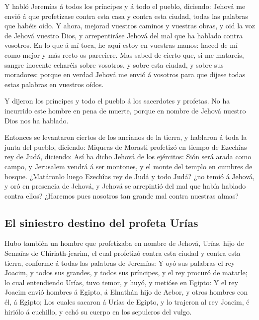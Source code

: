  Y habló Jeremías á todos los príncipes y á todo el
pueblo, diciendo: Jehová me envió á que profetizase contra esta casa y
contra esta ciudad, todas las palabras que habéis oído. 
Y ahora, mejorad vuestros caminos y vuestras obras, y oid la voz de
Jehová vuestro Dios, y arrepentiráse Jehová del mal que ha hablado
contra vosotros.  En lo que á mí toca, he aquí estoy en
vuestras manos: haced de mí como mejor y más recto os pareciere.
 Mas sabed de cierto que, si me matareis, sangre inocente
echaréis sobre vosotros, y sobre esta ciudad, y sobre sus moradores:
porque en verdad Jehová me envió á vosotros para que dijese todas estas
palabras en vuestros oídos.

 Y dijeron los príncipes y todo el pueblo á los
sacerdotes y profetas. No ha incurrido este hombre en pena de muerte,
porque en nombre de Jehová nuestro Dios nos ha hablado.

 Entonces se levantaron ciertos de los ancianos de la
tierra, y hablaron á toda la junta del pueblo, diciendo: 
Miqueas de Morasti profetizó en tiempo de Ezechîas rey de Judá,
diciendo: Así ha dicho Jehová de los ejércitos: Sión será arada como
campo, y Jerusalem vendrá á ser montones, y el monte del templo en
cumbres de bosque.  ¿Matáronlo luego Ezechîas rey de Judá
y todo Judá? ¿no temió á Jehová, y oró en presencia de Jehová, y Jehová
se arrepintió del mal que había hablado contra ellos? ¿Haremos pues
nosotros tan grande mal contra nuestras almas?

\hypertarget{el-siniestro-destino-del-profeta-uruxedas}{%
\subsection{El siniestro destino del profeta
Urías}\label{el-siniestro-destino-del-profeta-uruxedas}}

 Hubo también un hombre que profetizaba en nombre de
Jehová, Urías, hijo de Semaías de Chîriath-jearim, el cual profetizó
contra esta ciudad y contra esta tierra, conforme á todas las palabras
de Jeremías:  Y oyó sus palabras el rey Joacim, y todos
sus grandes, y todos sus príncipes, y el rey procuró de matarle; lo cual
entendiendo Urías, tuvo temor, y huyó, y metióse en Egipto:
 Y el rey Joacim envió hombres á Egipto, á Elnathán hijo
de Acbor, y otros hombres con él, á Egipto;  Los cuales
sacaron á Urías de Egipto, y lo trajeron al rey Joacim, é hiriólo á
cuchillo, y echó su cuerpo en los sepulcros del vulgo.

